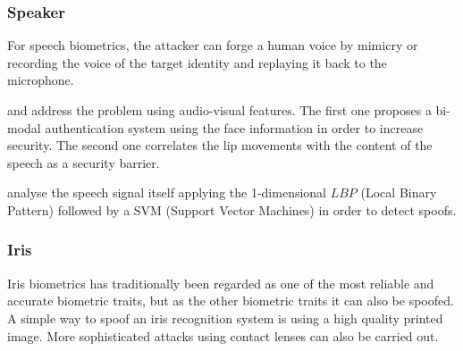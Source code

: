 



\subsubsection{Speaker}

For speech biometrics, the attacker can forge a human voice by mimicry or recording the voice of the target identity and replaying it back to the microphone. 

\cite{chetty2004liveness} and \cite{eveno2005speaker} address the problem using audio-visual features. The first one proposes a bi-modal authentication system using the face information in order to increase security. The second one correlates the lip movements with the content of the speech as a security barrier.

\cite{QimingZhu} analyse the speech signal itself applying the 1-dimensional $LBP$ (Local Binary Pattern) followed by a SVM (Support Vector Machines) in order to detect spoofs.

\subsubsection{Iris}

Iris biometrics has traditionally been regarded as one of the most reliable and accurate biometric traits, but as the other biometric traits it can also be spoofed. A simple way to spoof an iris recognition system is using a high quality printed image. More sophisticated attacks using contact lenses can also be carried out.

